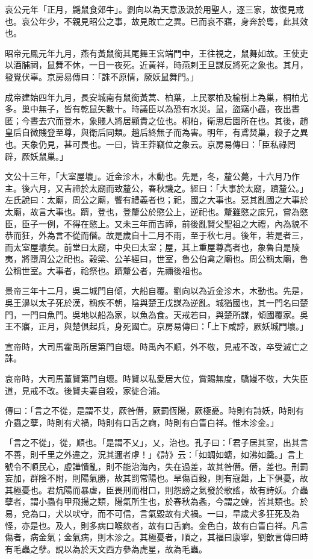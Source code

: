 \begin{pinyinscope}
哀公元年「正月，鼷鼠食郊牛」。劉向以為天意汲汲於用聖人，逐三家，故復見戒也。哀公年少，不親見昭公之事，故見敗亡之異。已而哀不寤，身奔於粵，此其效也。

昭帝元鳳元年九月，燕有黃鼠銜其尾舞王宮端門中，王往視之，鼠舞如故。王使吏以酒脯祠，鼠舞不休，一日一夜死。近黃祥，時燕剌王旦謀反將死之象也。其月，發覺伏辜。京房易傳曰：「誅不原情，厥妖鼠舞門。」

成帝建始四年九月，長安城南有鼠銜黃蒿、柏葉，上民冢柏及榆樹上為巢，桐柏尤多。巢中無子，皆有乾鼠矢數十。時議臣以為恐有水災。鼠，盜竊小蟲，夜出晝匿；今晝去穴而登木，象賤人將居顯貴之位也。桐柏，衛思后園所在也。其後，趙皇后自微賤登至尊，與衛后同類。趙后終無子而為害。明年，有鳶焚巢，殺子之異也。天象仍見，甚可畏也。一曰，皆王莽竊位之象云。京房易傳曰：「臣私祿罔辟，厥妖鼠巢。」

文公十三年，「大室屋壞」。近金沴木，木動也。先是，冬，釐公薨，十六月乃作主。後六月，又吉禘於太廟而致釐公，春秋譏之。經曰：「大事於太廟，躋釐公。」左氏說曰：太廟，周公之廟，饗有禮義者也；祀，國之大事也。惡其亂國之大事於太廟，故言大事也。躋，登也，登釐公於愍公上，逆祀也。釐雖愍之庶兄，嘗為愍臣，臣子一例，不得在愍上。又未三年而吉禘，前後亂賢父聖祖之大禮，內為貌不恭而狂，外為言不從而僭。故是歲自十二月不雨，至于秋七月。後年，若是者三，而太室屋壞矣。前堂曰太廟，中央曰太室；屋，其上重屋尊高者也，象魯自是陵夷，將墮周公之祀也。穀梁、公羊經曰，世室，魯公伯禽之廟也。周公稱太廟，魯公稱世室。大事者，祫祭也。躋釐公者，先禰後祖也。

景帝三年十二月，吳二城門自傾，大船自覆。劉向以為近金沴木，木動也。先是，吳王濞以太子死於漢，稱疾不朝，陰與楚王戊謀為逆亂。城猶國也，其一門名曰楚門，一門曰魚門。吳地以船為家，以魚為食。天戒若曰，與楚所謀，傾國覆家。吳王不寤，正月，與楚俱起兵，身死國亡。京房易傳曰：「上下咸誖，厥妖城門壞。」

宣帝時，大司馬霍禹所居第門自壞。時禹內不順，外不敬，見戒不改，卒受滅亡之誅。

哀帝時，大司馬董賢第門自壞。時賢以私愛居大位，賞賜無度，驕嫚不敬，大失臣道，見戒不改。後賢夫妻自殺，家徙合浦。

傳曰：「言之不從，是謂不艾，厥咎僭，厥罰恆陽，厥極憂。時則有詩妖，時則有介蟲之孽，時則有犬禍，時則有口舌之痾，時則有白眚白祥。惟木沴金。」

「言之不從」，從，順也。「是謂不乂」，乂，治也。孔子曰：「君子居其室，出其言不善，則千里之外違之，況其邇者虖！」《詩》云：「如蜩如螗，如沸如羹。」言上號令不順民心，虛譁憒亂，則不能治海內，失在過差，故其咎僭。僭，差也。刑罰妄加，群陰不附，則陽氣勝，故其罰常陽也。旱傷百穀，則有寇難，上下俱憂，故其極憂也。君炕陽而暴虐，臣畏刑而柑口，則怨謗之氣發於歌謠，故有詩妖。介蟲孽者，謂小蟲有甲飛揚之類，陽氣所生也，於春秋為螽，今謂之蝗，皆其類也。於易，兌為口，犬以吠守，而不可信，言氣毀故有犬禍。一曰，旱歲犬多狂死及為怪，亦是也。及人，則多病口喉欬者，故有口舌痾。金色白，故有白眚白祥。凡言傷者，病金氣；金氣病，則木沴之。其極憂者，順之，其福曰康寧，劉歆言傳曰時有毛蟲之孽。說以為於天文西方參為虎星，故為毛蟲。


\end{pinyinscope}
